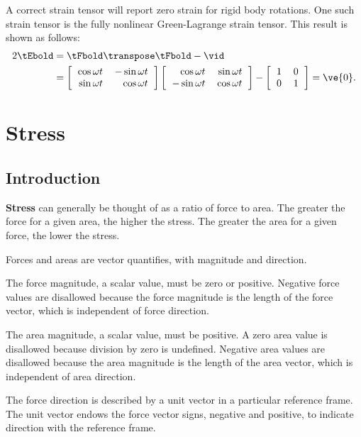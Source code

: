 A correct strain tensor will report zero strain for rigid body
rotations.  One such strain tensor is the fully nonlinear 
Green-Lagrange
strain tensor.  This result is shown as follows:
\begin{align}
 2 \tEbold &= \tFbold\transpose\tFbold - \vid \\
 &= 
 \left[
 \begin{tabular}{rr}
 $\cos \omega t$ & $-\sin \omega t$ \\
 $\sin \omega t$ & $\cos \omega t$ 
 \end{tabular}
 \right]
 \left[
 \begin{tabular}{rr}
 $\cos \omega t$ & $\sin \omega t$ \\
 $-\sin \omega t$ & $\cos \omega t$ 
 \end{tabular}
 \right]
 -   
 \left[
 \begin{tabular}{rr}
 $1$ & $0$ \\
 $0$ & $1$ 
 \end{tabular}
 \right] = \ve{0}. 
\end{align}

\chapter{Stress}

\section{Introduction}
{\bf Stress} can generally be thought of as a ratio
of force to area.  The greater the force for a given area, the higher
the stress.  The greater the area for a given force, the lower the
stress.  

Forces and areas are vector quantifies, 
with magnitude and direction.  

The force magnitude, a scalar value, must be zero or positive.  
Negative force values are disallowed because the force magnitude
is the length of the force vector, 
which is independent of force direction.

The area magnitude, a scalar value, must be positive.
A zero area value is disallowed because division by zero is
undefined.  Negative area values are disallowed because the 
area magnitude is the length of the area vector, 
which is independent of area direction.  

The force direction is described by a unit vector in a particular
reference frame.  The unit vector endows 
the force vector signs, negative and positive, to indicate
direction with the reference frame.  

